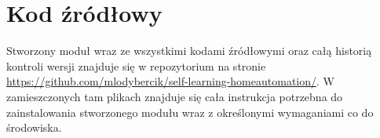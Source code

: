 \chapter{Kod źródłowy}\label{app1}

Stworzony moduł wraz ze wszystkimi kodami źródłowymi oraz całą historią kontroli wersji znajduje się w repozytorium na stronie \url{https://github.com/mlodybercik/self-learning-homeautomation/}. W zamieszczonych tam plikach znajduje się cała instrukcja potrzebna do zainstalowania stworzonego modułu wraz z określonymi wymaganiami co do środowiska.